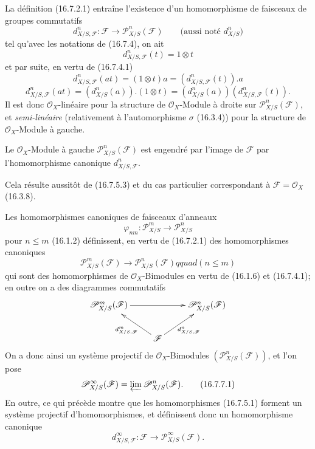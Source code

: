 \begin{env}[16.7.5]
\label{IV.16.7.5}
La définition (16.7.2.1) entraîne l'existence d'un homomorphisme de faisceaux
de groupes commutatifs
\[
  d_{X/S,\mathscr{F}}^n:\mathscr{F}
  \longrightarrow\mathscr{P}_{X/S}^n(\mathscr{F})
  \qquad\text{(aussi noté $d_{X/S}^n$)}
  \tag{16.7.5.1}
  \label{IV.16.7.5.1}
\]
tel qu'avec les notations de (16.7.4), on ait
\[
  d_{X/S,\mathscr{F}}^n(t)=1\otimes t
  \tag{16.7.5.2}
  \label{IV.16.7.5.2}
\]
et par suite, en vertu de (16.7.4.1)
\[
  d_{X/S,\mathscr{F}}^n(at)
  =(1\otimes t)a=(d_{X/S,\mathscr{F}}^n(t)).a
  \tag{16.7.5.3}
  \label{IV.16.7.5.3}
\]
\[
  d_{X/S,\mathscr{F}}^n(at)
  =(d_{X/S}^n(a)).(1\otimes t)
  =(d_{X/S}^n(a))(d_{X/S,\mathscr{F}}^n(t)).
  \tag{16.7.5.4}
  \label{IV.16.7.5.4}
\]
Il est donc $\mathcal{O}_X$-linéaire pour la structure de
$\mathcal{O}_X$-Module à droite sur $\mathscr{P}_{X/S}^n(\mathscr{F})$, et
\emph{semi-linéaire} (relativement à l'automorphisme $\sigma$ (16.3.4)) pour
la structure de $\mathcal{O}_X$-Module à gauche.
\end{env}

\begin{proposition}[16.7.6]
\label{IV.16.7.6}
Le $\mathcal{O}_X$-Module à gauche $\mathscr{P}_{X/S}^n(\mathscr{F})$ est
engendré par l'image de $\mathscr{F}$ par l'homomorphisme canonique
$d_{X/S,\mathscr{F}}^n$.
\end{proposition}

Cela résulte aussitôt de (16.7.5.3) et du cas particulier correspondant à
$\mathscr{F}=\mathcal{O}_X$ (16.3.8).

\begin{env}[16.7.7]
\label{IV.16.7.7}
Les homomorphismes canoniques de faisceaux d'anneaux
\[
  \varphi_{nm}:\mathscr{P}_{X/S}^m\longrightarrow\mathscr{P}_{X/S}^n
\]
pour $n\leq m$ (16.1.2) définissent, en vertu de (16.7.2.1) des
homomorphismes canoniques
\[
  \mathscr{P}_{X/S}^m(\mathscr{F})
  \longrightarrow\mathscr{P}_{X/S}^n(\mathscr{F})qquad(n\leq m)
\]
qui sont des homomorphismes de $\mathcal{O}_X$-Bimodules en vertu de (16.1.6)
et (16.7.4.1); en outre on a des diagrammes commutatifs
\[
  \xymatrix{
    \mathscr{P}_{X/S}^m(\mathscr{F})\ar[rr]
      &&\mathscr{P}_{X/S}^n(\mathscr{F})\\
    &\mathscr{F}\ar[ul]^-{d_{X/S,\mathscr{F}}^m}
      \ar[ur]_-{d_{X/S,\mathscr{F}}^n}
  }
\]
On a donc ainsi un système projectif de $\mathcal{O}_X$-Bimodules
$(\mathscr{P}_{X/S}^n(\mathscr{F}))$, et l'on pose
\[
  \mathscr{P}_{X/S}^{\infty}(\mathscr{F})
  =\varprojlim\mathscr{P}_{X/S}^n(\mathscr{F}).
  \tag{16.7.7.1}
  \label{IV.16.7.7.1}
\]
En outre, ce qui précède montre que les homomorphismes (16.7.5.1) forment un
système projectif d'homomorphismes, et définissent donc un homomorphisme
canonique
\[
  d_{X/S,\mathscr{F}}^{\infty}:\mathscr{F}
  \longrightarrow\mathscr{P}_{X/S}^{\infty}(\mathscr{F}).
  \tag{16.7.7.2}
  \label{IV.16.7.7.2}
\]
\end{env}

